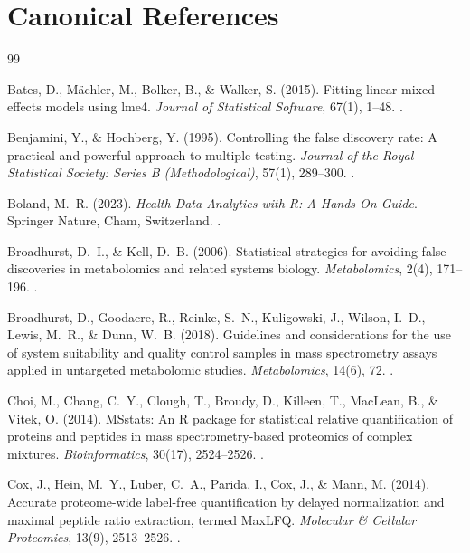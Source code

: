 \documentclass[11pt,twoside,openright]{book}
\begin{document}
\section*{Canonical References}

\begin{thebibliography}{99}

Bates, D., M\"achler, M., Bolker, B., \& Walker, S. (2015). Fitting linear mixed-effects models using lme4. \textit{Journal of Statistical Software}, 67(1), 1--48. .

Benjamini, Y., \& Hochberg, Y. (1995). Controlling the false discovery rate: A practical and powerful approach to multiple testing. \textit{Journal of the Royal Statistical Society: Series B (Methodological)}, 57(1), 289--300. .

Boland, M.~R. (2023). \textit{Health Data Analytics with R: A Hands-On Guide}. Springer Nature, Cham, Switzerland. .

Broadhurst, D.~I., \& Kell, D.~B. (2006). Statistical strategies for avoiding false discoveries in metabolomics and related systems biology. \textit{Metabolomics}, 2(4), 171--196. .

Broadhurst, D., Goodacre, R., Reinke, S.~N., Kuligowski, J., Wilson, I.~D., Lewis, M.~R., \& Dunn, W.~B. (2018). Guidelines and considerations for the use of system suitability and quality control samples in mass spectrometry assays applied in untargeted metabolomic studies. \textit{Metabolomics}, 14(6), 72. .

Choi, M., Chang, C.~Y., Clough, T., Broudy, D., Killeen, T., MacLean, B., \& Vitek, O. (2014). MSstats: An R package for statistical relative quantification of proteins and peptides in mass spectrometry-based proteomics of complex mixtures. \textit{Bioinformatics}, 30(17), 2524--2526. .

Cox, J., Hein, M.~Y., Luber, C.~A., Parida, I., Cox, J., \& Mann, M. (2014). Accurate proteome-wide label-free quantification by delayed normalization and maximal peptide ratio extraction, termed MaxLFQ. \textit{Molecular \& Cellular Proteomics}, 13(9), 2513--2526. .


\end{thebibliography}
\end{document}
